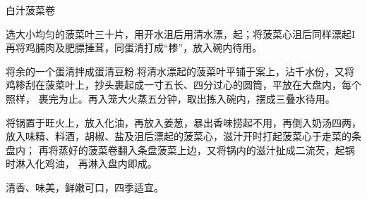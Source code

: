 \begin{recipe}{白汁菠菜卷}

\ingredients


\preparation

\step 选大小均匀的菠菜叶三十片，用开水沮后用清水漂，起；将菠菜心沮后同样漂起I
再将鸡脯肉及肥膘捶茸，同蛋清打成“糁”，放入碗内待用。

\step 将余的一个蛋清拌成蛋清豆粉.将清水漂起的菠菜叶平铺于案上，沾千水份，又将
鸡糁刮在菠菜叶上，抄头裹起成一寸五长、四分过心的圆筒，平放在大盘内，每个照样，
裹完为止。再入笼大火蒸五分钟，取出拣入碗内，摆成三叠水待用。

\step 将锅置于旺火上，放入化油，再放入姜葱，暴出香味捞起不用，再倒入奶汤四两，
放入味精、料酒，胡椒、盐及沮后漂起的菠菜心，滋汁开时打起菠菜心于走菜的条盘内；
再将蒸好的菠菜卷翻入条盘菠菜上边，又将锅内的滋汁扯成二流芡，起锅时淋入化鸡油，
再淋入盘内即成。

\features

清香、味美，鲜嫩可口，四季适宜。

\end{recipe}


